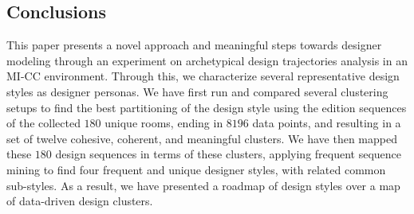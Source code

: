 \subsection{Conclusions}







This paper presents a novel approach and meaningful steps towards designer modeling through an experiment on archetypical design trajectories analysis in an MI-CC environment. Through this, we characterize several representative design styles as designer personas. We have first run and compared several clustering setups to find the best partitioning of the design style using the edition sequences of the collected $180$ unique rooms, ending in $8196$ data points, and resulting in a set of twelve cohesive, coherent, and meaningful clusters. We have then mapped these $180$ design sequences in terms of these clusters, applying frequent sequence mining to find four frequent and unique designer styles, with related common sub-styles. As a result, we have presented a roadmap of design styles over a map of data-driven design clusters. 

